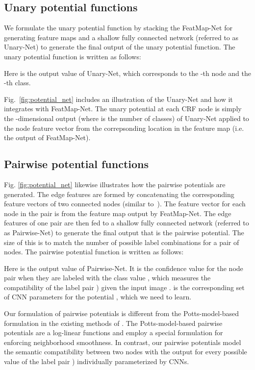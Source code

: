 \subsection{Unary potential functions}
We formulate the unary potential function by stacking the FeatMap-Net for generating feature maps and 
a shallow fully connected network (referred to as Unary-Net) to generate the final output of the unary potential function.
The unary potential function is written as follows:

Here  is the output value of Unary-Net, which corresponds to the -th node and the -th class.


Fig.~\ref{fig:potential_net} includes an illustration of the Unary-Net and how it integrates with FeatMap-Net.
The unary potential at each CRF node is simply the -dimensional output (where  is the number of classes) of Unary-Net applied to the node feature vector from the correpsonding location in the feature map (i.e. the output of FeatMap-Net).






\subsection{Pairwise potential functions}
Fig. \ref{fig:potential_net} likewise illustrates how the pairwise potentials are generated.  The edge features are formed by concatenating 
the corresponding feature vectors of two connected nodes (similar to~\cite{kolesnikov2014closed}).  The feature vector for each node in the pair is from the feature map output by FeatMap-Net. The edge features of one pair  are then fed to a shallow fully connected network (referred to as Pairwise-Net) to generate the final output that is the pairwise potential.  The size of this is  to match the number of possible label combinations for a pair of nodes. 
The pairwise potential function is written as follows:

Here  is the output value of Pairwise-Net.
It is the confidence value for the node pair  when they are labeled with the class value , which measures the compatibility of the label pair ) given the input image .
 is the corresponding set of CNN parameters for the potential , which we need to learn.







Our formulation of pairwise potentials is different from the Potts-model-based formulation in the existing methods of \cite{ChenPKMY14,zheng2015conditional}.
The Potts-model-based pairwise potentials are a log-linear functions and
employ a special formulation for enforcing neighborhood smoothness.
In contrast, our pairwise potentials model the semantic compatibility between two nodes
 with the output for every possible value of the label pair ) individually parameterized by CNNs. 


